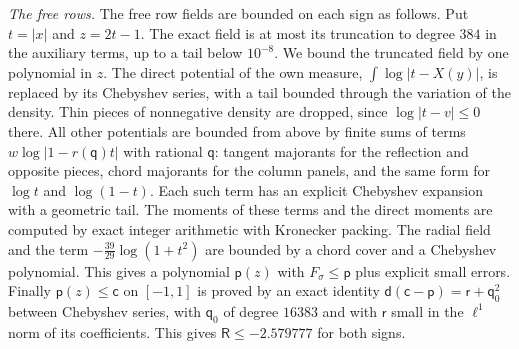 \emph{The free rows.} The free row fields are bounded on each sign as follows. Put $t=|x|$ and $z=2t-1$. The exact field is at most its truncation to degree $384$ in the auxiliary terms, up to a tail
below $10^{-8}$. We bound the truncated field by one polynomial in $z$. The direct potential of the own measure, $\int\log|t-X(y)|$, is replaced by its Chebyshev series,
with a tail bounded through the variation of the density. Thin pieces of nonnegative density are dropped, since $\log|t-v|\le0$ there. All other potentials
are bounded from above by finite sums of terms $w\log|1-r(\mathsf q)t|$ with rational $\mathsf q$: tangent majorants for the reflection and opposite pieces, chord majorants for the
column panels, and the same form for $\log t$ and $\log(1-t)$. Each such term has an explicit Chebyshev expansion with a geometric tail. The moments of these terms and the
direct moments are computed by exact integer arithmetic with Kronecker packing. The radial field and the term $-\frac{39}{29}\log(1+t^2)$ are bounded by a chord cover and a
Chebyshev polynomial. This gives a polynomial $\mathsf p(z)$ with $F_\sigma\le\mathsf p$ plus explicit small errors. Finally $\mathsf p(z)\le\mathsf c$ on $[-1,1]$ is proved by an exact identity
$\mathsf d(\mathsf c-\mathsf p)=\mathsf r+\mathsf q_0^2$ between Chebyshev series, with $\mathsf q_0$ of degree $16383$ and with $\mathsf r$ small in the $\ell^1$ norm of its coefficients. This gives
$\mathsf R\le-2.579777$ for both signs.
